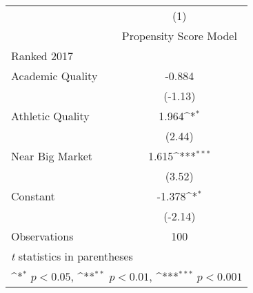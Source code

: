 {
\def\sym#1{\ifmmode^{#1}\else\(^{#1}\)\fi}
\begin{tabular}{l*{1}{c}}
\hline\hline
                    &\multicolumn{1}{c}{(1)}\\
                    &\multicolumn{1}{c}{Propensity Score Model}\\
\hline
Ranked 2017         &                     \\
Academic Quality    &      -0.884         \\
                    &     (-1.13)         \\
[1em]
Athletic Quality    &       1.964\sym{*}  \\
                    &      (2.44)         \\
[1em]
Near Big Market     &       1.615\sym{***}\\
                    &      (3.52)         \\
[1em]
Constant            &      -1.378\sym{*}  \\
                    &     (-2.14)         \\
\hline
Observations        &         100         \\
\hline\hline
\multicolumn{2}{l}{\footnotesize \textit{t} statistics in parentheses}\\
\multicolumn{2}{l}{\footnotesize \sym{*} \(p<0.05\), \sym{**} \(p<0.01\), \sym{***} \(p<0.001\)}\\
\end{tabular}
}
